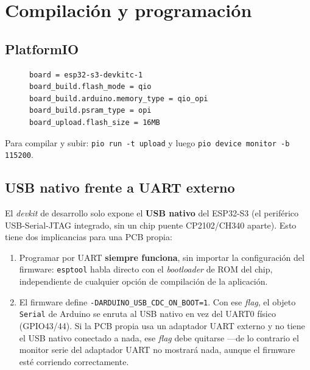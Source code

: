 \section{Compilación y programación}
\label{sec:build}

\subsection{PlatformIO}

\begin{figure}[H]
\begin{lstlisting}[style=plain,caption={Configuración relevante de \texttt{platformio.ini}.}]
board = esp32-s3-devkitc-1
board_build.flash_mode = qio
board_build.arduino.memory_type = qio_opi
board_build.psram_type = opi
board_upload.flash_size = 16MB
\end{lstlisting}
\end{figure}

Para compilar y subir: \texttt{pio run -t upload} y luego
\texttt{pio device monitor -b 115200}.

\subsection{USB nativo frente a UART externo}
El \textit{devkit} de desarrollo solo expone el \textbf{USB nativo} del
ESP32-S3 (el periférico USB-Serial-JTAG integrado, sin un chip puente
CP2102/CH340 aparte). Esto tiene dos implicancias para una PCB propia:

\begin{enumerate}
  \item Programar por UART \textbf{siempre funciona}, sin importar la
        configuración del firmware: \texttt{esptool} habla directo con el
        \textit{bootloader} de ROM del chip, independiente de cualquier
        opción de compilación de la aplicación.
  \item El firmware define \texttt{-DARDUINO\_USB\_CDC\_ON\_BOOT=1}. Con ese
        \textit{flag}, el objeto \texttt{Serial} de Arduino se enruta al
        USB nativo en vez del UART0 físico (GPIO43/44). Si la PCB propia usa
        un adaptador UART externo y no tiene el USB nativo conectado a
        nada, ese \textit{flag} debe quitarse —de lo contrario el monitor
        serie del adaptador UART no mostrará nada, aunque el firmware esté
        corriendo correctamente.
\end{enumerate}


